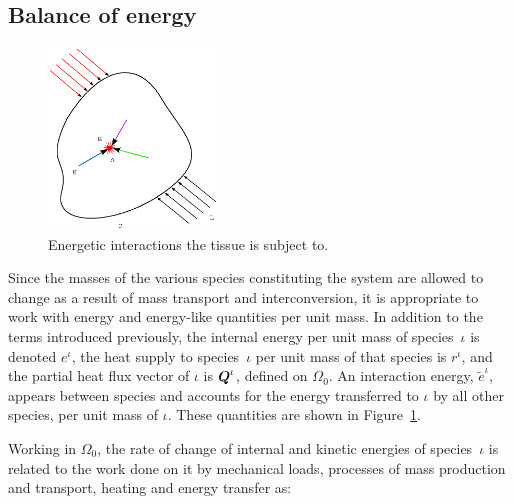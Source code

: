 \vspace{1cm} %

\subsection{Balance of energy}
\label{balance-of-energy}

\begin{figure}[ht]
  \centering
  \includegraphics[width=0.4\textwidth]{images/elucidation/continuum-potato-energy}
  \caption{Energetic interactions the tissue is subject to.}
  \label{continuum-potato-energy}
\end{figure}

Since the masses of the various species constituting the system are
allowed to change as a result of mass transport and interconversion,
it is appropriate to work with energy and energy-like quantities per
unit mass. In addition to the terms introduced previously, the
internal energy per unit mass of species~$\iota$ is denoted $e^\iota$,
the heat supply to species~$\iota$ per unit mass of that species is
$r^\iota$, and the partial heat flux vector of $\iota$ is $\mbox{\boldmath$ Q$}^\iota$,
defined on $\Omega_0$. An interaction energy, $\tilde{e}^\iota$,
appears between species and accounts for the energy transferred to
$\iota$ by all other species, per unit mass of $\iota$. These
quantities are shown in Figure~\ref{continuum-potato-energy}.

Working in $\Omega_0$, the rate of change of internal and kinetic
energies of species~$\iota$ is related to the work done on it by
mechanical loads, processes of mass production and transport, heating
and energy transfer as:

